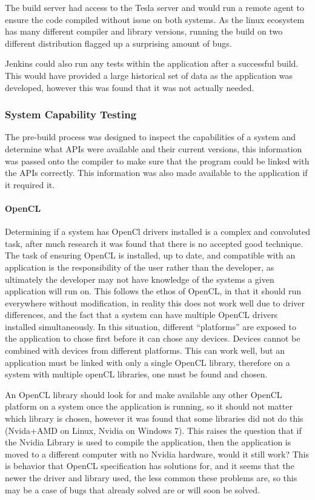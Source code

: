 \documentclass[12pt,a4paper]{article}
\begin{document}
The build server had access to the Tesla server and would run a remote agent to ensure the code compiled without issue on both systems. As the linux ecosystem has many different compiler and library versions, running the build on two different distribution flagged up a surprising amount of bugs.

Jenkins could also run any tests within the application after a successful build. This would have provided a large historical set of data as the application was developed, however this was found that it was not actually needed.



\subsubsection{System Capability Testing}
The pre-build process was designed to inspect the capabilities of a system and determine what APIs were available and their current versions, this information was passed onto the compiler to make sure that the program could be linked with the APIs correctly. This information was also made available to the application if it required it.
\paragraph{OpenCL}
Determining if a system has OpenCl drivers installed is a complex and convoluted task, after much research it was found that there is no accepted good technique. The task of ensuring OpenCL is installed, up to date, and compatible with an application is the responsibility of the user rather than the developer, as ultimately the developer may not have knowledge of the systems a given application will run on. This follows the ethos of OpenCL, in that it should run everywhere without modification, in reality this does not work well due to driver differences, and the fact that a system can have multiple OpenCL drivers installed simultaneously. In this situation, different “platforms” are exposed to the application to chose first before it can chose any devices.  Devices cannot be combined with devices from different platforms. This can work well, but an application must be linked with only a single OpenCL library, therefore on a system with multiple openCL libraries, one must be found and chosen.

An OpenCL library should look for and make available any other OpenCL platform on a system once the application is running, so it should not matter which library is chosen, however it was found that some libraries did not do this (Nvida+AMD on Linux, Nvidia on Windows 7). This raises the question that if the Nvidia Library is used to compile the application, then the application is moved to a different computer with no Nvidia hardware, would it still work? This is behavior that OpenCL specification has solutions for, and it seems that the newer the driver and library used, the less common these problems are, so this may be a case of bugs that already solved are or will soon be solved.
\end{document}
